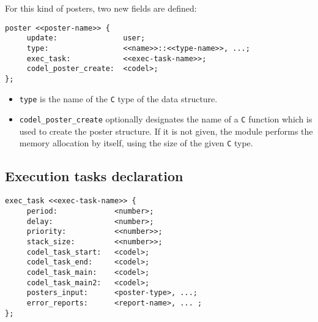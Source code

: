 For this kind of posters, two new fields are defined:

\begin{center}\begin{cartouche}\small\begin{verbatim}
poster <<poster-name>> {
     update:               user;
     type:                 <<name>>::<<type-name>>, ...;
     exec_task:            <<exec-task-name>>; 
     codel_poster_create:  <codel>;
};
\end{verbatim}\end{cartouche}\end{center}

\begin{itemize}
\item \texttt{type} is the name of the \texttt{C} type of the data structure.
\item \texttt{codel\_poster\_create} optionally designates the name of a \texttt{C}
function which is   used to create the  poster  structure. If  it is  not
given,  the  module performs the memory  allocation  by itself, using the
size of the  given \texttt{C} type.
\end{itemize}


\subsection{Execution tasks declaration}

\begin{center}\begin{cartouche}\small\begin{verbatim}
exec_task <<exec-task-name>> {
     period:             <number>;
     delay:              <number>;
     priority:           <<number>>;
     stack_size:         <<number>>;
     codel_task_start:   <codel>;
     codel_task_end:     <codel>;
     codel_task_main:    <codel>;
     codel_task_main2:   <codel>;
     posters_input:      <poster-type>, ...;
     error_reports:      <report-name>, ... ;
};
\end{verbatim}%
\end{cartouche}\end{center}

